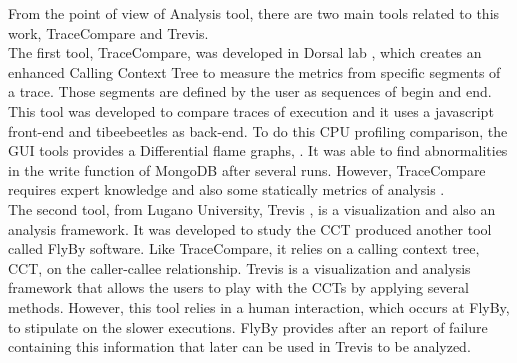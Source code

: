 From the point of view of Analysis tool, there are two main tools related to this work, TraceCompare and Trevis.\\
The first tool, TraceCompare, was developed in Dorsal lab \cite{tracecompare}, which creates an enhanced Calling Context Tree to measure the metrics from specific segments of a trace. Those segments are defined by the user as sequences of begin and end. This tool was developed to compare traces of execution and it uses a javascript front-end and tibeebeetles as back-end. To do this CPU profiling comparison, the GUI tools provides a Differential flame graphs, \cite{differential_flame}.
 It was able to find abnormalities in the write function of MongoDB after several runs. However, TraceCompare requires expert knowledge and also some statically metrics of analysis \cite{doray_thesis}.\\
 
The second tool, from Lugano University, Trevis \cite{trevis}, is a visualization and also an analysis framework. It was developed to study the CCT produced another tool called FlyBy software. Like TraceCompare, it relies on a calling context tree, CCT, on the caller-callee relationship. Trevis is a visualization and analysis framework that 
allows the users to play with the CCTs by applying several methods.
However, this tool relies in a human interaction, which occurs at FlyBy, to stipulate on the slower executions. FlyBy provides after an report of failure containing this information that later can be used in Trevis to be analyzed.\\

